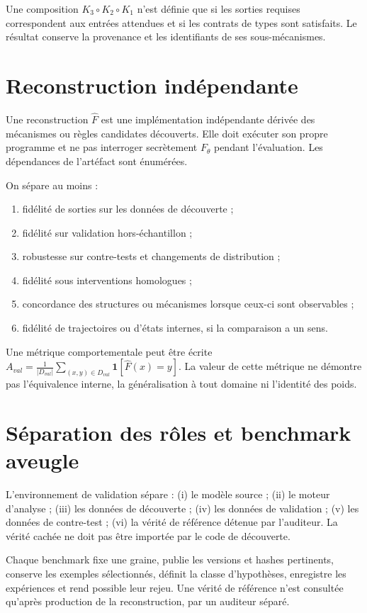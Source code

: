 \documentclass[11pt,a4paper]{article}
\begin{document}
Une composition $K_3\circ K_2\circ K_1$ n'est définie que si les sorties requises correspondent aux entrées attendues et si les contrats de types sont satisfaits. Le résultat conserve la provenance et les identifiants de ses sous-mécanismes.

\section{Reconstruction indépendante}
Une reconstruction $\widehat{F}$ est une implémentation indépendante dérivée des mécanismes ou règles candidates découverts. Elle doit exécuter son propre programme et ne pas interroger secrètement $F_\theta$ pendant l'évaluation. Les dépendances de l'artéfact sont énumérées.

On sépare au moins :
\begin{enumerate}
\item fidélité de sorties sur les données de découverte ;
\item fidélité sur validation hors-échantillon ;
\item robustesse sur contre-tests et changements de distribution ;
\item fidélité sous interventions homologues ;
\item concordance des structures ou mécanismes lorsque ceux-ci sont observables ;
\item fidélité de trajectoires ou d'états internes, si la comparaison a un sens.
\end{enumerate}
Une métrique comportementale peut être écrite $A_{val}=\frac{1}{|D_{val}|}\sum_{(x,y)\in D_{val}}\mathbf{1}[\widehat F(x)=y]$. La valeur de cette métrique ne démontre pas l'équivalence interne, la généralisation à tout domaine ni l'identité des poids.

\section{Séparation des rôles et benchmark aveugle}
L'environnement de validation sépare : (i) le modèle source ; (ii) le moteur d'analyse ; (iii) les données de découverte ; (iv) les données de validation ; (v) les données de contre-test ; (vi) la vérité de référence détenue par l'auditeur. La vérité cachée ne doit pas être importée par le code de découverte.

Chaque benchmark fixe une graine, publie les versions et hashes pertinents, conserve les exemples sélectionnés, définit la classe d'hypothèses, enregistre les expériences et rend possible leur rejeu. Une vérité de référence n'est consultée qu'après production de la reconstruction, par un auditeur séparé.
\end{document}

